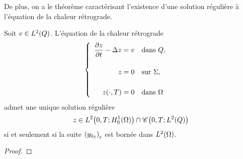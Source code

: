 De plus, on a le théorème caractérisant l'existence d'une solution
régulière à l'équation de la chaleur rétrograde.

\begin{theoreme}\label{thm:controllability-result-5}%
    Soit $v\in L^{2}\!\left({Q}\right)$. L'équation de la chaleur rétrograde
    \begin{equation}\label{eq:initial-problem-2}
        \begin{cases}\displaystyle
            \begin{array}{rl}
                \dfrac{\partial{}z}{\partial{}t} - \Delta z = v & \text{dans}\ Q,\\
                \\
                z = 0 & \text{sur}\ \Sigma,\\
                \\
                z(\cdot,T) = 0 & \text{dans}\ \Omega
            \end{array}
        \end{cases}
    \end{equation}
    admet une unique solution régulière
    \begin{equation}
        z\in L^{2}\!\left({0,T;H_{0}^{1}(\Omega)}\right)\cap
        \mathscr{C}\!\left({0,T;L^{2}\!\left({Q}\right)}\right)
    \end{equation}
    si et seulement si la suite $\displaystyle
    {\left({{y_{0}}_{\varepsilon}}\right)}_{\varepsilon}$ est bornée dans
    $L^{2}\!\left({\Omega}\right)$.
\end{theoreme}

\begin{proof}%
\end{proof}
